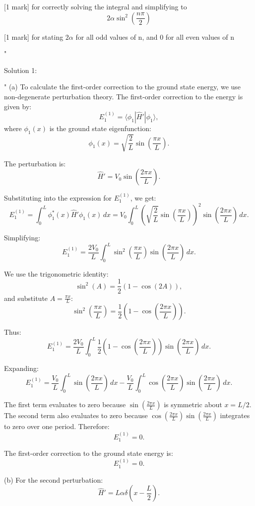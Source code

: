 [1 mark] for correctly solving the integral and simplifying to 
\[ 2 \alpha \sin^{2}\left(\frac{n \pi}{2} \right) \]

[1 mark] for stating \(2 \alpha \) for all odd values of n, and 0 for all even values of n 

"

Solution 1: 

"
(a) To calculate the first-order correction to the ground state energy, we use non-degenerate perturbation theory. The first-order correction to the energy is given by:
\[
E_1^{(1)} = \langle \phi_1 | \hat{H}' | \phi_1 \rangle,
\]
where \(\phi_1(x)\) is the ground state eigenfunction:
\[
\phi_1(x) = \sqrt{\frac{2}{L}} \sin\left(\frac{\pi x}{L}\right).
\]

The perturbation is:
\[
\hat{H}' = V_0 \sin\left(\frac{2\pi x}{L}\right).
\]

Substituting into the expression for \(E_1^{(1)}\), we get:
\[
E_1^{(1)} = \int_0^L \phi_1^*(x) \hat{H}' \phi_1(x) \, dx = V_0 \int_0^L \left(\sqrt{\frac{2}{L}} \sin\left(\frac{\pi x}{L}\right)\right)^2 \sin\left(\frac{2\pi x}{L}\right) \, dx.
\]

Simplifying:
\[
E_1^{(1)} = \frac{2V_0}{L} \int_0^L \sin^2\left(\frac{\pi x}{L}\right) \sin\left(\frac{2\pi x}{L}\right) \, dx.
\]

We use the trigonometric identity:
\[
\sin^2(A) = \frac{1}{2} \left(1 - \cos(2A)\right),
\]
and substitute \(A = \frac{\pi x}{L}\):
\[
\sin^2\left(\frac{\pi x}{L}\right) = \frac{1}{2} \left(1 - \cos\left(\frac{2\pi x}{L}\right)\right).
\]

Thus:
\[
E_1^{(1)} = \frac{2V_0}{L} \int_0^L \frac{1}{2} \left(1 - \cos\left(\frac{2\pi x}{L}\right)\right) \sin\left(\frac{2\pi x}{L}\right) \, dx.
\]

Expanding:
\[
E_1^{(1)} = \frac{V_0}{L} \int_0^L \sin\left(\frac{2\pi x}{L}\right) \, dx - \frac{V_0}{L} \int_0^L \cos\left(\frac{2\pi x}{L}\right) \sin\left(\frac{2\pi x}{L}\right) \, dx.
\]

The first term evaluates to zero because \(\sin\left(\frac{2\pi x}{L}\right)\) is symmetric about \(x = L/2\). The second term also evaluates to zero because \(\cos\left(\frac{2\pi x}{L}\right) \sin\left(\frac{2\pi x}{L}\right)\) integrates to zero over one period. Therefore:
\[
E_1^{(1)} = 0.
\]

The first-order correction to the ground state energy is:
\[
\boxed{E_1^{(1)} = 0.}
\]

(b) For the second perturbation:
\[
\hat{H}' = L \alpha \delta\left(x - \frac{L}{2}\right).
\]


